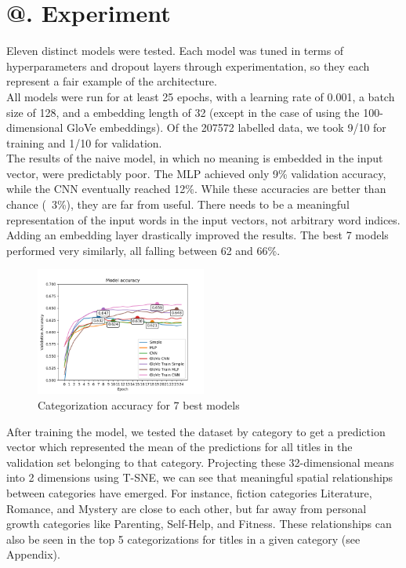 \documentclass[jou,apacite, 10px]{apa6}
\makeatletter
\newcommand*{\rom}[1]{\expandafter\@slowromancap\romannumeral #1@}
\makeatother
\begin{document}
\section{\rom{5}. Experiment}
Eleven distinct models were tested. Each model was tuned in terms of hyperparameters and dropout layers through experimentation, so they each represent a fair example of the architecture.\\
All models were run for at least 25 epochs, with a learning rate of 0.001, a batch size of 128, and a embedding length of 32 (except in the case of using the 100-dimensional GloVe embeddings). Of the 207572 labelled data, we took 9/10 for training and 1/10 for validation.\\
The results of the naive model, in which no meaning is embedded in the input vector, were predictably poor. The MLP achieved only 9\% validation accuracy, while the CNN eventually reached 12\%. While these accuracies are better than chance (~3\%), they are far from useful. There needs to be a meaningful representation of the input words in the input vectors, not arbitrary word indices.\\
Adding an embedding layer drastically improved the results. The best 7 models performed very similarly, all falling between 62 and 66\%.\\
\begin{figure}[h!]
    \centering
     \includegraphics[width=0.5\textwidth]{images/good_models_comparison_small}
        \caption{Categorization accuracy for 7 best models}
\end{figure}
After training the model, we tested the dataset by category to get a prediction vector which represented the mean of the predictions for all titles in the validation set belonging to that category. Projecting these 32-dimensional means into 2 dimensions using T-SNE, we can see that meaningful spatial relationships between categories have emerged. For instance, fiction categories Literature, Romance, and Mystery are close to each other, but far away from personal growth categories like Parenting, Self-Help, and Fitness. These relationships can also be seen in the top 5 categorizations for titles in a given category (see Appendix).\\
\end{document}
